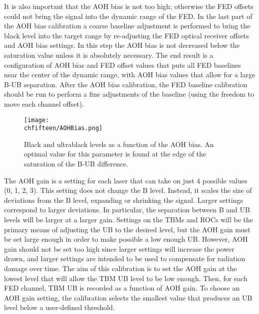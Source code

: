 It is also important that the AOH bias is not too high; otherwise the FED offsets could not bring the signal into the dynamic range of the FED.
In the last part of the AOH bias calibration a coarse baseline adjustment is performed to bring the black level into the target range by re-adjusting the FED optical receiver offsets and AOH bias settings.
In this step the AOH bias is not decreased below the saturation value unless it is absolutely necessary.
The end result is a configuration of AOH bias and FED offset values that puts all FED baselines near the center of the dynamic range, with AOH bias values that allow for a large B-UB separation.
After the AOH bias calibration, the FED baseline calibration should be run to perform a fine adjustments of the baseline (using the freedom to move each channel offset).

\begin{figure}[!htb]
 \begin{center}
 \texttt{[image: \\chfifteen/AOHBias.png]}
 \end{center}
 \caption{Black and ultrablack levels as a function of the AOH bias. An optimal value for this parameter is found at the edge of the saturation of the B-UB difference.}
 \label{fig:AOHBias}
\end{figure}

The AOH gain is a setting for each laser that can take on just 4 possible values (0, 1, 2, 3).
This setting does not change the B level. Instead, it scales the size of deviations from the B level, expanding or shrinking the signal.
Larger settings correspond to larger deviations. In particular, the separation between B and UB levels will be larger at a larger gain.
Settings on the TBMs and ROCs will be the primary means of adjusting the UB to the desired level, but the AOH gain must be set large enough in order to make possible a low enough UB.
However, AOH gain should not be set too high since larger settings will increase the power drawn, and larger settings are intended to be used to compensate for radiation damage over time.
The aim of this calibration is to set the AOH gain at the lowest level that will allow the TBM UB level to be low enough.
Then, for each FED channel, TBM UB is recorded as a function of AOH gain. To choose an AOH gain setting, the calibration selects the smallest value that produces an UB level below a user-defined threshold.

